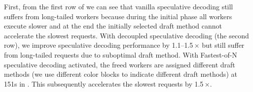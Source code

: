 First, from the first row of 
we can see that vanilla speculative decoding still
suffers from long-tailed workers
because during the initial phase all workers execute slower
and at the end the initially selected draft method
cannot accelerate the slowest requests.
With decoupled speculative decoding (the second row), we improve speculative decoding performance
by {1.1--1.5}\,$\times$ but still suffer from long-tailed requests
due to suboptimal draft method.
With Fastest-of-N speculative decoding activated, the freed workers are assigned
different draft methods (we use different color blocks to indicate different draft methods)
at 151s in .
This subsequently accelerates the slowest requests by {1.5}\,$\times$.

